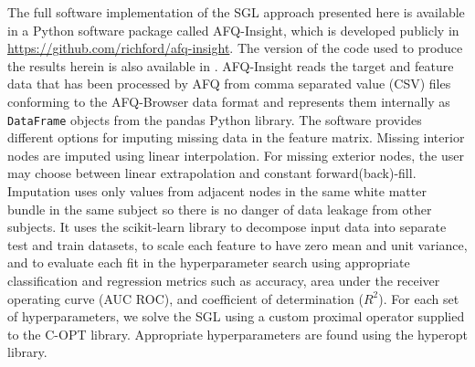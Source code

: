 The full software implementation of the SGL approach presented here is available
in a Python software package called AFQ-Insight, which is developed publicly in
\url{https://github.com/richford/afq-insight}. The version of the code used to
produce the results herein is also available in .
AFQ-Insight reads the target and feature data that has been processed by AFQ
from comma separated value (CSV) files conforming to the AFQ-Browser data
format\cite{yeatman2018browser} and represents them internally as
\lstinline{DataFrame} objects from the pandas Python
library\cite{mckinney2010data}. The software provides different options for
imputing missing data in the feature matrix. Missing interior nodes are imputed
using linear interpolation. For missing exterior nodes, the user may choose
between linear extrapolation and constant forward(back)-fill. Imputation uses
only values from adjacent nodes in the same white matter bundle in the same
subject so there is no danger of data leakage from other subjects. It uses the
scikit-learn\cite{scikit-learn} library to decompose input data into separate
test and train datasets, to scale each feature to have zero mean and
unit variance, and to evaluate each fit in the hyperparameter search using
appropriate classification and regression metrics such as accuracy, area
under the receiver operating curve (AUC ROC), and coefficient of determination
($R^2$). For each set of hyperparameters, we solve the SGL using a custom
proximal operator supplied to the C-OPT library\cite{copt}. Appropriate
hyperparameters are found using the hyperopt library\cite{Bergstra_2015}.
